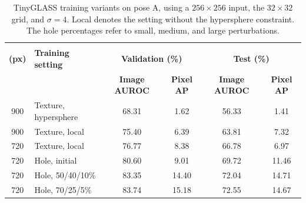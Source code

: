 \begin{table}[ht!]
    \centering
    \small
    \setlength{\tabcolsep}{3pt}
    \begin{tabular}{@{}c l c c c c@{}}
        \toprule
        \shortstack{\textbf{Crop}\\\textbf{(px)}} & \textbf{Training setting} & \multicolumn{2}{c}{\textbf{Validation (\%)}} & \multicolumn{2}{c}{\textbf{Test (\%)}}                                            \\
                                                  &                           & \textbf{Image AUROC}                         & \textbf{Pixel AP}                      & \textbf{Image AUROC} & \textbf{Pixel AP} \\
        \midrule
        \midrule
        900                                       & Texture, hypersphere      & 68.31                                        & 1.62                                   & 56.33                & 1.41              \\
        900                                       & Texture, local            & 75.40                                        & 6.39                                   & 63.81                & 7.32              \\
        \midrule
        720                                       & Texture, local            & 76.77                                        & 8.38                                   & 66.78                & 6.97              \\
        720                                       & Hole, initial             & 80.60                                        & 9.01                                   & 69.72                & 11.46             \\
        720                                       & Hole, 50/40/10\%          & 83.35                                        & 14.40                                  & 72.04                & 14.71             \\
        720                                       & Hole, 70/25/5\%           & 83.74                                        & 15.18                                  & 72.55                & 14.67             \\
        \bottomrule
    \end{tabular}
    \vspace{5mm}
    \caption{TinyGLASS training variants on pose A, using a \(256\times256\) input, the \(32\times32\) grid, and \(\sigma=4\). Local denotes the setting without the hypersphere constraint. The hole percentages refer to small, medium, and large perturbations.}
    \label{tab:damage-tinyglass-training-ablation}
\end{table}

